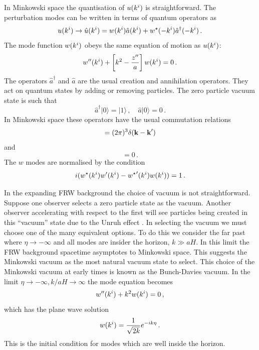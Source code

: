 In Minkowski space the quantisation of $u(k^i)$ is straightforward.
The perturbation modes can be written in terms of quantum operators as
% 
\begin{equation}
 u(k^i)\rightarrow\hat{u}(k^i) = 
  w(k^i) \hat{a}(k^i) + w^\star(-k^i)\hat{a}^\dagger(-k^i) \,.
\end{equation}
%
The mode function $w(k^i)$ obeys the same equation of motion as $u(k^i)$:
% 
\begin{equation}
\label{eq:weqn-intro}
 w''(k^i) + \left[ k^2 -\frac{z''}{a}\right]w(k^i) = 0\,.
\end{equation}
% 
The operators $\hat{a}^\dagger$ and $\hat{a}$ are the usual creation and
annihilation operators. They act on quantum states by adding or
removing particles. The zero particle vacuum state is such that
% 
\begin{equation}
 \hat{a}^\dagger|0\rangle = |1\rangle\,,\quad \hat{a}|0\rangle = 0\,.
\end{equation}
% 
In Minkowski space these operators have the usual commutation relations
% 
\begin{equation}
 [\hat{a}(\kb), \hat{a}^\dagger(\kb')] = (2\pi)^3 \delta(\kb -\kb') \\
\end{equation}
and
\begin{equation}
[\hat{a}(\kb), \hat{a}(\kb')] = 0\,.
\end{equation}
% 
The $w$ modes are normalised by the condition \cite{Mukhanov:2005sc}
% 
\begin{equation}
\label{eq:quantcondition-intro}
 i(w^\star(k^i)w'(k^i) - {w^{\star}}'(k^i)w(k^i)) = 1\,.
\end{equation}


In the expanding FRW background the choice of vacuum is not straightforward.
Suppose one observer selects a zero particle state as the vacuum. Another
observer accelerating with respect to the first will see particles being
created in this ``vacuum'' state due to the Unruh effect
\cite{Kinney2009, Unruh1976a}. In selecting the vacuum we must choose one of the
many
equivalent options.
To do this we consider the far past where $\eta\rightarrow -\infty$ and all
modes
are insider the horizon, $k\gg aH$. In this limit the FRW background spacetime
asymptotes to Minkowski space. This suggests the Minkowski vacuum as the
most natural vacuum state to select. This choice of the Minkowski vacuum at
early times is known as the Bunch-Davies vacuum.
% 
In the limit $\eta\rightarrow -\infty, k/aH\rightarrow \infty$ the mode equation
 becomes
% 
\begin{equation}
  w''(k^i) + k^2 w(k^i) = 0\,,
\end{equation}
% 
which has the plane wave solution
% 
\begin{equation}
\label{eq:subhsoln-intro}
 w(k^i) = \frac{1}{\sqrt{2k}} e^{-ik\eta}\,.
\end{equation}
% 
This is the initial condition for modes which are well inside the horizon.

